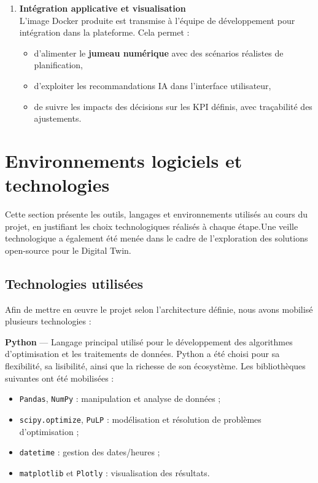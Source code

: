 \begin{enumerate}
	\item \textbf{Intégration applicative et visualisation} \\[0.3em]
	L’image Docker produite est transmise à l’équipe de développement pour intégration dans la plateforme. Cela permet :
	\begin{itemize}
		\item d’alimenter le \textbf{jumeau numérique} avec des scénarios réalistes de planification,
		\item d’exploiter les recommandations IA dans l’interface utilisateur,
		\item de suivre les impacts des décisions sur les KPI définis, avec traçabilité des ajustements.
	\end{itemize}
\end{enumerate}




\section{Environnements logiciels et technologies}

Cette section présente les outils, langages et environnements utilisés au cours du projet, en justifiant les choix technologiques réalisés à chaque étape.Une veille technologique a également été menée dans le cadre de l'exploration des solutions open-source pour le Digital Twin.

\subsection{Technologies utilisées}

Afin de mettre en œuvre le projet selon l’architecture définie, nous avons mobilisé plusieurs technologies :

\vspace{0.3cm}

\noindent\textbf{Python} — Langage principal utilisé pour le développement des algorithmes d’optimisation et les traitements de données. Python a été choisi pour sa flexibilité, sa lisibilité, ainsi que la richesse de son écosystème. Les bibliothèques suivantes ont été mobilisées :
\begin{itemize}
	\item \texttt{Pandas}, \texttt{NumPy} : manipulation et analyse de données ;
	\item \texttt{scipy.optimize}, \texttt{PuLP} : modélisation et résolution de problèmes d’optimisation ;
	\item \texttt{datetime} : gestion des dates/heures ;
	\item \texttt{matplotlib} et \texttt{Plotly} : visualisation des résultats.
\end{itemize}

